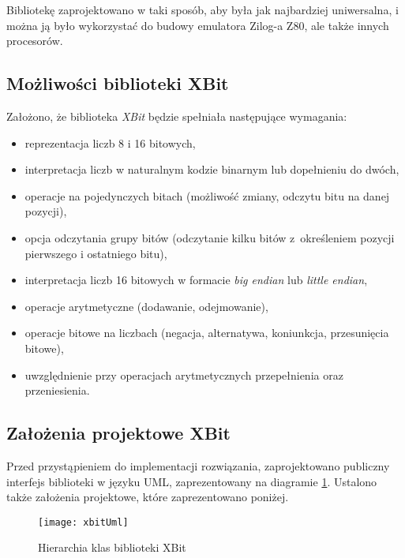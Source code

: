     Bibliotekę zaprojektowano w taki sposób, aby była jak najbardziej uniwersalna, i można ją było wykorzystać do budowy emulatora Zilog-a Z80, ale także innych procesorów. 

	\subsection{Możliwości biblioteki XBit}
	Założono, że biblioteka \emph{XBit} będzie spełniała następujące wymagania:
	\begin{itemize}  
		\item reprezentacja liczb 8 i 16 bitowych,
		\item interpretacja liczb w naturalnym kodzie binarnym lub dopełnieniu do dwóch,
		\item operacje na pojedynczych bitach (możliwość zmiany, odczytu bitu na danej pozycji),
		\item opcja odczytania grupy bitów (odczytanie kilku bitów z~określeniem pozycji pierwszego i ostatniego bitu),
		\item interpretacja liczb 16 bitowych w formacie \emph{big endian} lub \emph{little endian},
		\item operacje arytmetyczne (dodawanie, odejmowanie),
		\item operacje bitowe na liczbach (negacja, alternatywa, koniunkcja, przesunięcia bitowe),
		\item uwzględnienie przy operacjach arytmetycznych przepełnienia oraz przeniesienia.
	\end{itemize} 
	
	\subsection{Założenia projektowe XBit}
	Przed przystąpieniem do implementacji rozwiązania, zaprojektowano publiczny interfejs biblioteki w języku UML, zaprezentowany na diagramie \ref{img:xbitUml}. Ustalono także założenia projektowe, które zaprezentowano poniżej. 
	
	\begin{figure}[h]
		\centering
		\texttt{[image: xbitUml]}
		\caption{Hierarchia klas biblioteki XBit}
		\label{img:xbitUml}
	\end{figure}
	
